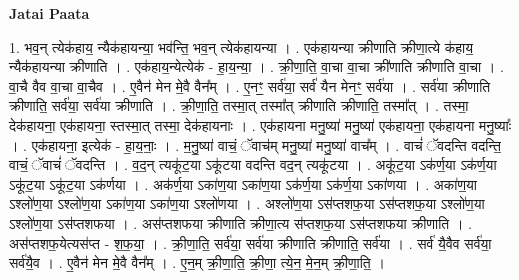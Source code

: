 \documentclass[17pt]{extarticle}
\begin{document}
\textbf{Jatai Paata} \newline

1. भव॒न् त्येक॑हाय॒ न्यैक॑हायन्या॒ भव॑न्ति॒ भव॒न् त्येक॑हायन्या । . एक॑हायन्या क्रीणाति क्रीणा॒त्ये क॑हाय॒ न्यैक॑हायन्या क्रीणाति । . एक॑हाय॒न्येत्येक॑ - हा॒य॒न्या॒ । . क्री॒णा॒ति॒ वा॒चा वा॒चा क्री॑णाति क्रीणाति वा॒चा । . वा॒चै वैव वा॒चा वा॒चैव । . ए॒वैन॑ मेन मे॒वै वैन᳚म् । . ए॒नꣳ॒॒ सर्व॑या॒ सर्व॑ यैन मेनꣳ॒॒ सर्व॑या । . सर्व॑या क्रीणाति क्रीणाति॒ सर्व॑या॒ सर्व॑या क्रीणाति । . क्री॒णा॒ति॒ तस्मा॒त् तस्मा᳚त् क्रीणाति क्रीणाति॒ तस्मा᳚त् । . तस्मा॒ देक॑हायना॒ एक॑हायना॒ स्तस्मा॒त् तस्मा॒ देक॑हायनाः । . एक॑हायना मनु॒ष्या॑ मनु॒ष्या॑ एक॑हायना॒ एक॑हायना मनु॒ष्याः᳚ । . एक॑हायना॒ इत्येक॑ - हा॒य॒नाः॒ । . म॒नु॒ष्या॑ वाचं॒ ॅवाच॑म् मनु॒ष्या॑ मनु॒ष्या॑ वाच᳚म् । . वाचं॑ ॅवदन्ति वदन्ति॒ वाचं॒ ॅवाचं॑ ॅवदन्ति । . व॒द॒न् त्यकू॑ट॒या ऽकू॑टया वदन्ति वद॒न् त्यकू॑टया । . अकू॑ट॒या ऽक॑र्ण॒या ऽक॑र्ण॒या ऽकू॑ट॒या ऽकू॑ट॒या ऽक॑र्णया । . अक॑र्ण॒या ऽका॑ण॒या ऽका॑ण॒या ऽक॑र्ण॒या ऽक॑र्ण॒या ऽका॑णया । . अका॑ण॒या ऽश्लो॑ण॒या ऽश्लो॑ण॒या ऽका॑ण॒या ऽका॑ण॒या ऽश्लो॑णया । . अश्लो॑ण॒या ऽस॑प्तशफ॒या ऽस॑प्तशफ॒या ऽश्लो॑ण॒या ऽश्लो॑ण॒या ऽस॑प्तशफया । . अस॑प्तशफया क्रीणाति क्रीणा॒त्य स॑प्तशफ॒या ऽस॑प्तशफया क्रीणाति । . अस॑प्तशफ॒येत्यस॑प्त - श॒फ॒या॒ । . क्री॒णा॒ति॒ सर्व॑या॒ सर्व॑या क्रीणाति क्रीणाति॒ सर्व॑या । . सर्व॑ यै॒वैव सर्व॑या॒ सर्व॑यै॒व । . ए॒वैन॑ मेन मे॒वै वैन᳚म् । . ए॒न॒म् क्री॒णा॒ति॒ क्री॒णा॒ त्ये॒न॒ मे॒न॒म् क्री॒णा॒ति॒ । \newline
\end{document}
